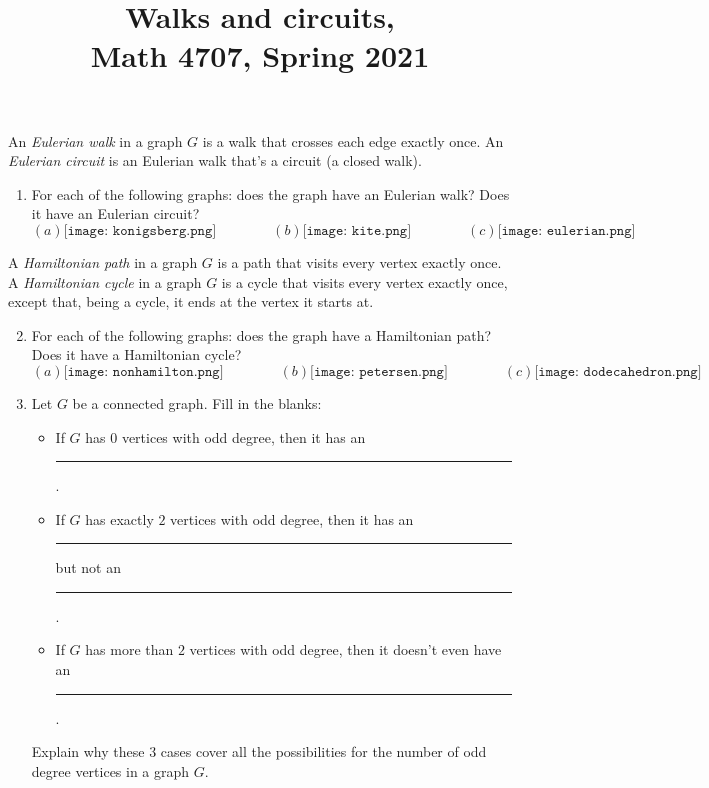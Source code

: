 \documentclass[11pt]{article}
\title{Walks and circuits, \\ Math 4707, Spring 2021}
\date{}
\begin{document}
\maketitle

\thispagestyle{empty}

\vspace{-0.6in}


An \emph{Eulerian walk} in a graph $G$ is a walk that crosses each edge exactly once. An \emph{Eulerian circuit} is an Eulerian walk that's a circuit (a closed walk).

\begin{enumerate}

\item For each of the following graphs: does the graph have an Eulerian walk? Does it have an Eulerian circuit?
\[ (a) \texttt{[image: konigsberg.png]} \qquad \qquad (b) \texttt{[image: kite.png]} \qquad \qquad (c) \texttt{[image: eulerian.png]} \]

\end{enumerate}

A \emph{Hamiltonian path} in a graph $G$ is a path that visits every vertex exactly once. A \emph{Hamiltonian cycle} in a graph $G$ is a cycle that visits every vertex exactly once, except that, being a cycle, it ends at the vertex it starts at.

\begin{enumerate}

\setcounter{enumi}{1}

\item For each of the following graphs: does the graph have a Hamiltonian path? Does it have a Hamiltonian cycle?
\[ (a) \texttt{[image: nonhamilton.png]} \qquad \qquad (b) \texttt{[image: petersen.png]} \qquad \qquad (c) \texttt{[image: dodecahedron.png]}  \]



\setcounter{enumi}{2}
\item Let $G$ be a connected graph. Fill in the blanks:
\begin{itemize}
\item If $G$ has $0$ vertices with odd degree, then it has an  \rule{2cm}{0.15mm}.
\item If $G$ has exactly $2$ vertices with odd degree, then it has an \rule{2cm}{0.15mm} but not an  \rule{2cm}{0.15mm}.
\item If $G$ has more than $2$ vertices with odd degree, then it doesn't even have an \rule{2cm}{0.15mm}.
\end{itemize}
Explain why these $3$ cases cover all the possibilities for the number of odd degree vertices in a graph $G$.
\end{enumerate}
\end{document}
